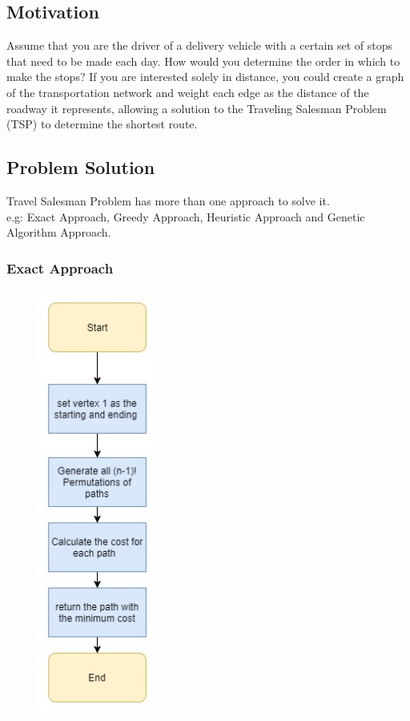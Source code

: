 \documentclass[12pt]{article}
\newcounter{subsubsubsection}[subsubsection]
\begin{document}
\subsection{ Motivation }
Assume that you are the driver of a delivery vehicle with a certain set of stops that need to be made each day. How would you determine the order in which to make the stops? If you are interested solely in distance, you could create a graph of the transportation network and weight each edge as the distance of the roadway it represents, allowing a solution to the Traveling Salesman Problem (TSP) to determine the shortest route.

\subsection{ Problem Solution }
Travel Salesman Problem has more than one approach to solve it.\\
e.g:  Exact Approach, Greedy Approach, Heuristic Approach and Genetic Algorithm Approach.

\subsubsection{ Exact Approach }

\begin{center}
	\includegraphics[width=6cm,height=14cm]{./assets/flowchart/brute-force.png}\\
\end{center}
\end{document}
